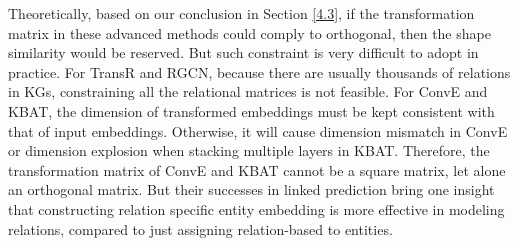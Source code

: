 \documentclass[sigconf,camera-ready]{acmart}
\begin{document}
\begin{table}[t]
\renewcommand\arraystretch{1.3}
\centering
{}
\caption{A summary of some representative KGs embedding models. $\|$ represents the concatenate operation. $\ast$ and $\omega$ represent the convolution operation and kernel. $d_i$ represents the degree of entity $e_i$.}\label{table:methods}
\end{table}

Theoretically, based on our conclusion in Section \ref{4.3}, if the transformation matrix in these advanced methods could comply to orthogonal, then the shape similarity would be reserved.
But such constraint is very difficult to adopt in practice.
For TransR and RGCN, because there are usually thousands of relations in KGs, constraining all the relational matrices is not feasible.
For ConvE and KBAT, the dimension of transformed embeddings must be kept consistent with that of input embeddings.
Otherwise, it will cause dimension mismatch in ConvE or dimension explosion when stacking multiple layers in KBAT.
Therefore, the transformation matrix of ConvE and KBAT cannot be a square matrix, let alone an orthogonal matrix.
But their successes in linked prediction bring one insight that constructing relation specific entity embedding is more effective in modeling relations,
compared to just assigning relation-based to entities.
\end{document}
